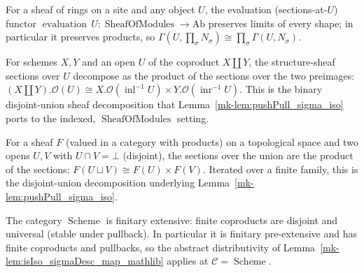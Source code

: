 \begin{lemma}
  \label{mk-lem:evaluation_preserves_products_mathlib}
  \mathlibok

  For a sheaf of rings on a site and any object \(U\), the evaluation (sections-at-\(U\))
  functor \(\operatorname{evaluation}\,U : \operatorname{SheafOfModules} \to \mathrm{Ab}\)
  preserves limits of every shape; in particular it preserves products, so \(\Gamma(U,
  \prod_\sigma N_\sigma) \cong \prod_\sigma \Gamma(U, N_\sigma)\).
\end{lemma}

\begin{lemma}
  \label{mk-lem:coprodPresheafObjIso_mathlib}
  \mathlibok

  For schemes \(X, Y\) and an open \(U\) of the coproduct \(X \amalg Y\), the structure-sheaf
  sections over \(U\) decompose as the product of the sections over the two preimages:
  \((X \amalg Y).\mathcal{O}(U) \cong X.\mathcal{O}(\operatorname{inl}^{-1} U) \times
  Y.\mathcal{O}(\operatorname{inr}^{-1} U)\). This is the binary disjoint-union sheaf
  decomposition that Lemma~\ref{mk-lem:pushPull_sigma_iso} ports to the indexed,
  \(\operatorname{SheafOfModules}\) setting.
\end{lemma}

\begin{lemma}
  \label{mk-lem:isProductOfDisjoint_mathlib}
  \mathlibok

  For a sheaf \(F\) (valued in a category with products) on a topological space and two opens
  \(U, V\) with \(U \sqcap V = \bot\) (disjoint), the sections over the union are the product
  of the sections: \(F(U \sqcup V) \cong F(U) \times F(V)\). Iterated over a finite family,
  this is the disjoint-union decomposition underlying Lemma~\ref{mk-lem:pushPull_sigma_iso}.
\end{lemma}

\begin{lemma}
  \label{mk-lem:finitaryExtensive_scheme_mathlib}
  \mathlibok

  The category \(\operatorname{Scheme}\) is finitary extensive: finite coproducts are disjoint
  and universal (stable under pullback). In particular it is finitary pre-extensive and has
  finite coproducts and pullbacks, so the abstract distributivity of
  Lemma~\ref{mk-lem:isIso_sigmaDesc_map_mathlib} applies at \(\mathcal{C} = \operatorname{Scheme}\).
\end{lemma}

